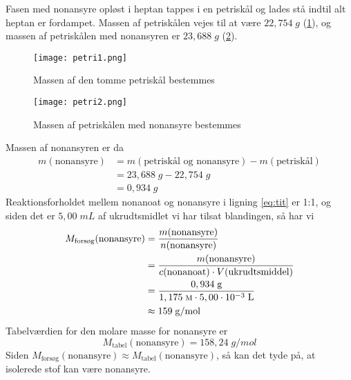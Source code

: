 \documentclass{report}
\begin{document}
Fasen med nonansyre opløst i heptan tappes i en petriskål og lades stå indtil alt heptan er fordampet.
Massen af petriskålen vejes til at være $22,754 \;\unit{g} $ (\cref{fig:petri1}), og massen af petriskålen med nonansyren er $23,688 \;\unit{g} $ (\cref{fig:petri2}).
\begin{figure}[H]
\begin{center}
  \texttt{[image: petri1.png]}
\end{center}
\caption{Massen af den tomme petriskål bestemmes}
\label{fig:petri1}
\end{figure}
\begin{figure}[H]
\begin{center}
  \texttt{[image: petri2.png]}
\end{center}
\caption{Massen af petriskålen med nonansyre bestemmes}
\label{fig:petri2}
\end{figure}
Massen af nonansyren er da
\begin{equation*}
\begin{split}
  m(\text{nonansyre} )&=m(\text{petriskål og nonansyre} ) - m(\text{petriskål} )\\
  &=23,688 \;\unit{g} - 22,754 \;\unit{g} \\
  &=0,934 \;\unit{g} 
\end{split}
\end{equation*}
Reaktionsforholdet mellem nonanoat og nonansyre i ligning \cref{eq:tit} er 1:1, og siden det er $5,00 \;\unit{mL} $ af ukrudtsmidlet vi har tilsat blandingen, så har vi 
\begin{equation*}
\begin{split}
  M_{\text{forsøg}}(\text{nonansyre} )&=\frac{m(\text{nonansyre} )}{n(\text{nonansyre} )}\\
  &=\frac{m(\text{nonansyre} )}{c(\text{nonanoat} ) \cdot V(\text{ukrudtsmiddel})}\\
  &=\frac{0,934 \;\unit{g} }{1,175 \;\unit{\textsc{m}} \cdot 5,00 \cdot 10 ^{-3} \;\unit{L} }\\
  &\approx 159 \;\unit{g/mol} 
\end{split}
\end{equation*}
Tabelværdien for den molare masse for nonansyre er 
\[
M _{\text{tabel} }(\text{nonansyre} ) =158,24 \;\unit{g/mol} 
\] 
Siden $M_{\text{forsøg}}(\text{nonansyre} ) \approx M_{\text{tabel}}(\text{nonansyre} )$, så kan det tyde på, at isolerede stof kan være nonansyre.
\end{document}
